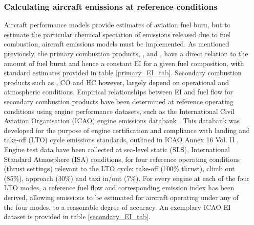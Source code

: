 \subsubsection{Calculating aircraft emissions at reference conditions}
Aircraft performance models provide estimates of aviation fuel burn, but to estimate the particular chemical speciation of emissions released due to fuel combustion, aircraft emissions models must be implemented. As mentioned previously, the primary combustion products, ,  and , have a direct relation to the amount of fuel burnt and hence a constant EI for a given fuel composition, with standard estimates provided in table \ref{primary_EI_tab}. Secondary combustion products such as , CO and HC however, largely depend on operational and atmospheric conditions. Empirical relationships between EI and fuel flow for secondary combustion products have been determined at reference operating conditions using engine performance datasets, such as the International Civil Aviation Organisation (ICAO) engine emissions databank \cite{ICAOEEDB}.  This databank was developed for the purpose of engine certification and compliance with landing and take-off (LTO) cycle emissions standards, outlined in ICAO Annex 16 Vol. II \cite{ICAO2008}. Engine test data have been collected at sea-level static (SLS), International Standard Atmosphere (ISA) conditions, for four reference operating conditions (thrust settings) relevant to the LTO cycle: take-off (100\% thrust), climb out (85\%), approach (30\%) and taxi in/out (7\%). For every engine at each of the four LTO modes, a reference fuel flow and corresponding emission index has been derived, allowing emissions to be estimated for aircraft operating under any of the four modes, to a reasonable degree of accuracy. An exemplary ICAO EI dataset is provided in table \ref{secondary_EI_tab}.




